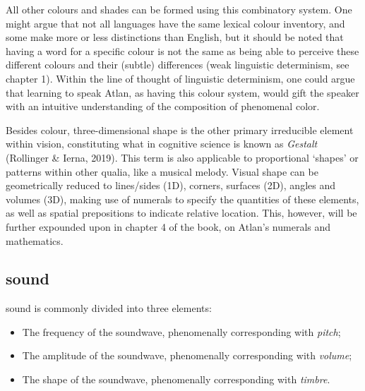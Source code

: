 
All other colours and shades can be formed using this combinatory system. One might argue that not all languages have the same lexical colour inventory, and some make more or less distinctions than English, but it should be noted that having a word for a specific colour is not the same as being able to perceive these different colours and their (subtle) differences (weak linguistic determinism, see chapter 1). Within the line of thought of linguistic determinism, one could argue that learning to speak Atlan, as having this colour system, would gift the speaker with an intuitive understanding of the composition of phenomenal color. 

Besides colour, three-dimensional shape is the other primary irreducible element within vision, constituting what in cognitive science is known as {\it Gestalt} (Rollinger \& Ierna, 2019). This term is also applicable to proportional ‘shapes’ or patterns within other qualia, like a musical melody. Visual shape can be geometrically reduced to lines/sides (1D), corners, surfaces (2D), angles and volumes (3D), making use of numerals to specify the quantities of these elements, as well as spatial prepositions to indicate relative location. This, however, will be further expounded upon in chapter 4 of the book, on Atlan’s numerals and mathematics.  


\subsection{sound}

\noindent sound is commonly divided into three elements:

\begin{itemize}
\item   The frequency of the soundwave, phenomenally corresponding with \textit{pitch}; 

\item   The amplitude of the soundwave, phenomenally corresponding with \textit{volume};

\item   The shape of the soundwave, phenomenally corresponding with \textit{timbre}.

\end{itemize}

